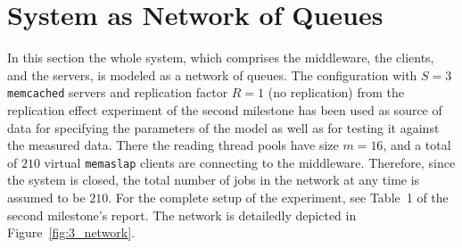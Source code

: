 \documentclass[11pt]{article}
\theoremstyle{definition}
\renewcommand\t\texttt
\begin{document}
\clearpage

\section{System as Network of Queues}\label{sec:network-of-queues}

In this section the whole system, which comprises the middleware, the clients, and the servers, is modeled as a network of queues.
The configuration with $S=3$ \t{memcached} servers and replication factor $R=1$ (no replication) from the replication effect experiment of the second milestone has been used as source of data for specifying the parameters of the model as well as for testing it against the measured data.
There the reading thread pools have size $m=16$, and a total of $210$ virtual \t{memaslap} clients are connecting to the middleware.
Therefore, since the system is closed, the total number of jobs in the network at any time is assumed to be $210$.
For the complete setup of the experiment, see Table~1 of the second milestone's report.
The network is detailedly depicted in Figure~\ref{fig:3_network}.
\end{document}
